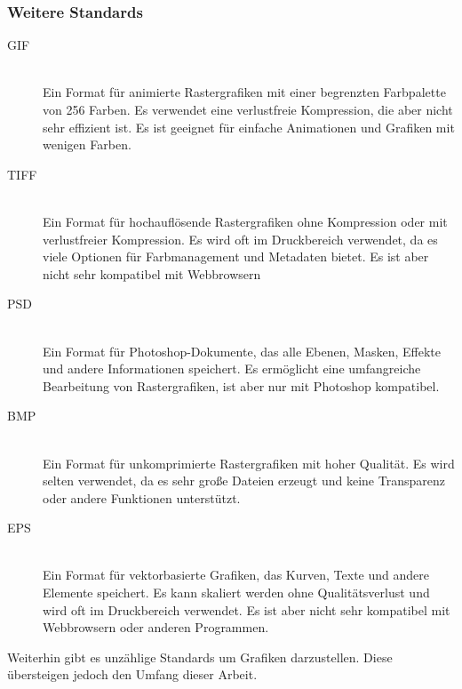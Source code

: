     \subsubsection{Weitere Standards}
        \begin{description}
            \item[\ac{GIF}]~\\
                Ein Format für animierte Rastergrafiken mit einer begrenzten Farbpalette von 256 Farben. 
                Es verwendet eine verlustfreie Kompression, die aber nicht sehr effizient ist. 
                Es ist geeignet für einfache Animationen und Grafiken mit wenigen Farben.
            \item[\ac{TIFF}] \\ 
                Ein Format für hochauflösende Rastergrafiken ohne Kompression oder mit verlustfreier Kompression.
                Es wird oft im Druckbereich verwendet, da es viele Optionen für Farbmanagement und Metadaten bietet. 
                Es ist aber nicht sehr kompatibel mit Webbrowsern \\
            \item[\ac{PSD}] \\
                Ein Format für Photoshop-Dokumente, das alle Ebenen, Masken, Effekte und andere Informationen speichert. 
                Es ermöglicht eine umfangreiche Bearbeitung von Rastergrafiken, ist aber nur mit Photoshop kompatibel.\\
            \item[\ac{BMP}] \\
                Ein Format für unkomprimierte Rastergrafiken mit hoher Qualität. 
                Es wird selten verwendet, da es sehr große Dateien erzeugt und keine Transparenz oder andere Funktionen unterstützt. \\
            \item[\ac{EPS}] \\
                Ein Format für vektorbasierte Grafiken, das Kurven, Texte und andere Elemente speichert. 
                Es kann skaliert werden ohne Qualitätsverlust und wird oft im Druckbereich verwendet. 
                Es ist aber nicht sehr kompatibel mit Webbrowsern oder anderen Programmen. \\
        \end{description}
        Weiterhin gibt es unzählige Standards um Grafiken darzustellen. Diese übersteigen jedoch den Umfang dieser Arbeit.
